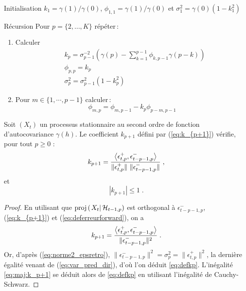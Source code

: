 \begin{algorithm}
\item[Initialisation] $k_1=\gamma(1)/\gamma(0)$, $\phi_{1,1}=\gamma(1)/\gamma(0)$ et $\sigma_1^2=\gamma(0)(1-k_1^2)$
\item[R\'ecursion] Pour $p=\{2,\dots,K\}$ r\'ep\'eter\,:
\begin{enumerate}[label=(\alph*)]
\item Calculer
\begin{align*}
&k_p=\sigma_{p-1}^{-2} \left( \gamma(p) - \sum_{k=1}^{p-1} \phi_{k,p-1} \gamma(p-k) \right) \\
&\phi_{p,p}=k_p \\
&\sigma_{p}^2=\sigma_{p-1}^2(1-k_p^2)
\end{align*}
\item Pour $m\in \{1,\cdots,p-1\}$ calculer\,:
\[
\phi_{m,p}=\phi_{m,p-1}-k_p\phi_{p-m,p-1}
\]
\end{enumerate}
\end{algorithm}

\begin{proposition}
Soit $(X_t)$ un processus stationnaire au second ordre de fonction d'autocovariance
$\gamma(h)$.
Le coefficient $k_{p+1}$ d\'efini par
(\ref{eq:k_{p+1}}) v\'erifie, pour tout $p\geq 0$ :
\begin{equation}
 \label{eq:defkp}
 k_{p+1}=\frac{\left\langle \epsilon_{t,p}^+, \epsilon_{t-p-1,p}^- \right\rangle}
        {\|\epsilon_{t,p}^+ \| \,\, \|\epsilon_{t-p-1,p}^- \|}\;,
\end{equation}
et
\begin{equation}
\label{eq:maj:k_p+1}
|k_{p+1}|\leq 1\;.
\end{equation}
\end{proposition}
\begin{proof}\smartqed
En utilisant que $\proj{X_{t}}{\cH_{t-1,p}}$ est orthogonal \`a
$\epsilon_{t-p-1,p}^-$, (\ref{eq:k_{p+1}}) et (\ref{eq:deferreurforward}), on a
$$
k_{p+1}=\frac{\left\langle \epsilon_{t,p}^+, \epsilon_{t-p-1,p}^- \right\rangle}{\|\epsilon_{t-p-1,p}^- \|^2}\;.
$$
Or, d'apr\`es (\ref{eq:norme2_epsretro}), $\|\epsilon_{t-p-1,p}^-
\|^2=\sigma_p^2=\|\epsilon_{t,p}^+ \|^2$, la derni\`ere \'egalit\'e venant
de (\ref{eq:var_pred_dir}), d'o\`u l'on d\'eduit \eqref{eq:defkp}.
L'in\'egalit\'e \eqref{eq:maj:k_p+1} se d\'eduit alors de \eqref{eq:defkp}
en utilisant l'in\'egalit\'e de Cauchy-Schwarz.

\end{proof}

